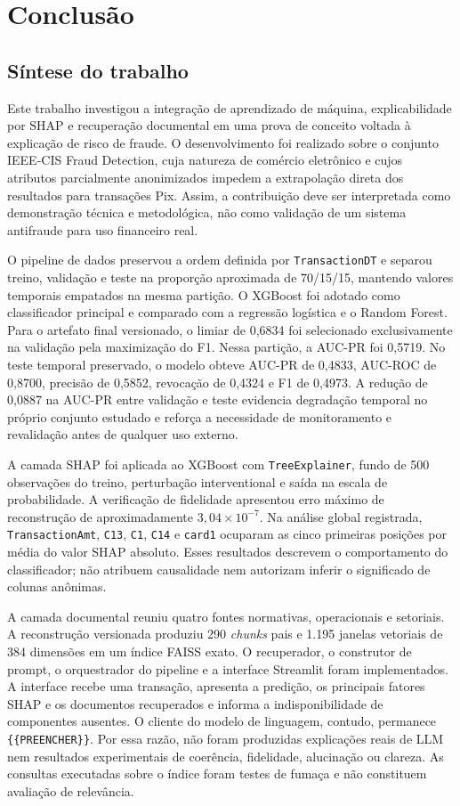 \chapter{Conclusão}

\section{Síntese do trabalho}

Este trabalho investigou a integração de aprendizado de máquina, explicabilidade por SHAP e recuperação documental em uma prova de conceito voltada à explicação de risco de fraude. O desenvolvimento foi realizado sobre o conjunto IEEE-CIS Fraud Detection, cuja natureza de comércio eletrônico e cujos atributos parcialmente anonimizados impedem a extrapolação direta dos resultados para transações Pix. Assim, a contribuição deve ser interpretada como demonstração técnica e metodológica, não como validação de um sistema antifraude para uso financeiro real.

O pipeline de dados preservou a ordem definida por \texttt{TransactionDT} e separou treino, validação e teste na proporção aproximada de 70/15/15, mantendo valores temporais empatados na mesma partição. O XGBoost foi adotado como classificador principal e comparado com a regressão logística e o Random Forest. Para o artefato final versionado, o limiar de 0,6834 foi selecionado exclusivamente na validação pela maximização do F1. Nessa partição, a AUC-PR foi 0,5719. No teste temporal preservado, o modelo obteve AUC-PR de 0,4833, AUC-ROC de 0,8700, precisão de 0,5852, revocação de 0,4324 e F1 de 0,4973. A redução de 0,0887 na AUC-PR entre validação e teste evidencia degradação temporal no próprio conjunto estudado e reforça a necessidade de monitoramento e revalidação antes de qualquer uso externo.

A camada SHAP foi aplicada ao XGBoost com \texttt{TreeExplainer}, fundo de 500 observações do treino, perturbação interventional e saída na escala de probabilidade. A verificação de fidelidade apresentou erro máximo de reconstrução de aproximadamente $3{,}04 \times 10^{-7}$. Na análise global registrada, \texttt{TransactionAmt}, \texttt{C13}, \texttt{C1}, \texttt{C14} e \texttt{card1} ocuparam as cinco primeiras posições por média do valor SHAP absoluto. Esses resultados descrevem o comportamento do classificador; não atribuem causalidade nem autorizam inferir o significado de colunas anônimas.

A camada documental reuniu quatro fontes normativas, operacionais e setoriais. A reconstrução versionada produziu 290 \emph{chunks} pais e 1.195 janelas vetoriais de 384 dimensões em um índice FAISS exato. O recuperador, o construtor de prompt, o orquestrador do pipeline e a interface Streamlit foram implementados. A interface recebe uma transação, apresenta a predição, os principais fatores SHAP e os documentos recuperados e informa a indisponibilidade de componentes ausentes. O cliente do modelo de linguagem, contudo, permanece \texttt{\{\{PREENCHER\}\}}. Por essa razão, não foram produzidas explicações reais de LLM nem resultados experimentais de coerência, fidelidade, alucinação ou clareza. As consultas executadas sobre o índice foram testes de fumaça e não constituem avaliação de relevância.

